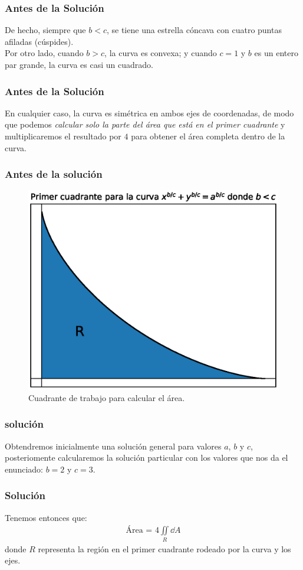 \begin{frame}
\frametitle{Antes de la Solución}
De hecho, siempre que $b < c$, se tiene una estrella cóncava con cuatro puntas afiladas (cúspides).
\\
\bigskip
Por otro lado, cuando $b > c$, la curva es convexa; y cuando $c = 1$ y $b$ es un entero par grande, la curva es casi un cuadrado.
\end{frame}
\begin{frame}
\frametitle{Antes de la Solución}
En cualquier caso, la curva es simétrica en ambos ejes de coordenadas, de modo que podemos \emph{calcular solo la parte del área que está en el primer cuadrante} y multiplicaremos el resultado por $4$ para obtener el área completa dentro de la curva.
\end{frame}
\begin{frame}
\frametitle{Antes de la solución}
\begin{figure}[H]
    \centering
    \includegraphics[scale=0.5]{Imagenes/plot_curva_estrella_02.eps}
    \caption{Cuadrante de trabajo para calcular el área.}
    \label{fig:figura_curva_estrella}
\end{figure}
\end{frame}
\begin{frame}
\frametitle{solución}
Obtendremos inicialmente una solución general para valores $a$, $b$ y $c$, posteriomente calcularemos la solución particular con los valores que nos da el enunciado: $b = 2$ y $c = 3$.
\end{frame}
\begin{frame}
\frametitle{Solución}
Tenemos entonces que:
\begin{align*}
\mbox{Área = } 4 \iint \limits_{R} \dd{A}
\end{align*}
donde $R$ representa la región en el primer cuadrante rodeado por la curva y los ejes.
\end{frame}
